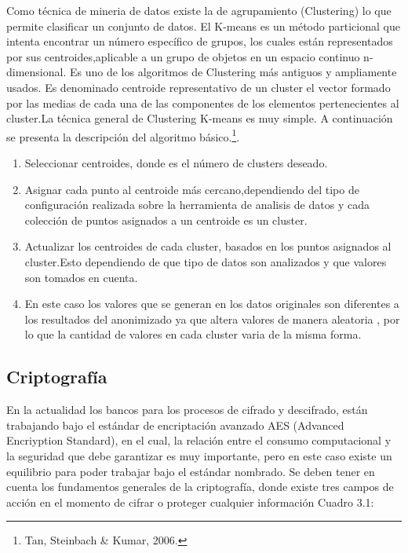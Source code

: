 \documentclass[a4paper,openright,12pt]{book}
\theoremstyle{definition}
\theoremstyle{remark}
\begin{document}
Como técnica de mineria de datos existe  la de agrupamiento (Clustering) lo que permite clasificar un conjunto de datos. El  K-means es un método particional que intenta encontrar un número específico de grupos, los cuales están representados por sus centroides,aplicable a un grupo de objetos en un espacio continuo n-dimensional. Es uno de los algoritmos de Clustering más antiguos y ampliamente usados.
Es denominado centroide representativo de un cluster el vector formado por las medias de cada una de las componentes de los elementos pertenecientes
al cluster.La técnica general de Clustering K-means es muy simple. A continuación se presenta la descripción del algoritmo básico.\footnote{Tan, Steinbach \& Kumar, 2006.}.

\begin{enumerate}
	\item Seleccionar centroides, donde es el número de clusters deseado.
    \item Asignar cada punto al centroide más cercano,dependiendo del tipo de configuración realizada sobre la herramienta de analisis de datos y cada colección de puntos asignados a un centroide es un cluster.
    \item Actualizar los centroides de cada cluster, basados en los puntos asignados al cluster.Esto dependiendo de que tipo de datos son analizados y que valores son tomados en cuenta.
    
    \item En este caso los valores que se generan en los datos originales son diferentes a los resultados del anonimizado ya que altera valores de manera aleatoria , por lo que la cantidad de valores en cada cluster varia de la misma forma.
   
\end{enumerate}

    \subsection{Criptografía}
    En la actualidad los bancos para los procesos de cifrado y descifrado, están trabajando bajo el estándar de encriptación avanzado AES (Advanced Encriyption Standard), en el cual, la relación entre el consumo computacional y la seguridad que debe garantizar es muy importante, pero en este caso existe un equilibrio para poder trabajar bajo el estándar nombrado. Se deben tener en cuenta los fundamentos generales de la criptografía, donde existe tres campos de acción en el momento de cifrar o proteger cualquier información Cuadro 3.1: 
\end{document}
